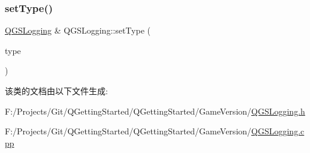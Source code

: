 \mbox{\label{class_q_g_s_logging_ac432aac0f9c0ae89a4987dd9ce345ba3}} 
\subsubsection{\texorpdfstring{set\+Type()}{setType()}}
{\footnotesize\ttfamily \mbox{\hyperlink{class_q_g_s_logging}{Q\+G\+S\+Logging}} \& Q\+G\+S\+Logging\+::set\+Type (\begin{DoxyParamCaption}\item[{const Q\+String \&}]{type }\end{DoxyParamCaption})}



该类的文档由以下文件生成\+:\begin{DoxyCompactItemize}
\item 
F\+:/\+Projects/\+Git/\+Q\+Getting\+Started/\+Q\+Getting\+Started/\+Game\+Version/\mbox{\hyperlink{_q_g_s_logging_8h}{Q\+G\+S\+Logging.\+h}}\item 
F\+:/\+Projects/\+Git/\+Q\+Getting\+Started/\+Q\+Getting\+Started/\+Game\+Version/\mbox{\hyperlink{_q_g_s_logging_8cpp}{Q\+G\+S\+Logging.\+cpp}}\end{DoxyCompactItemize}

